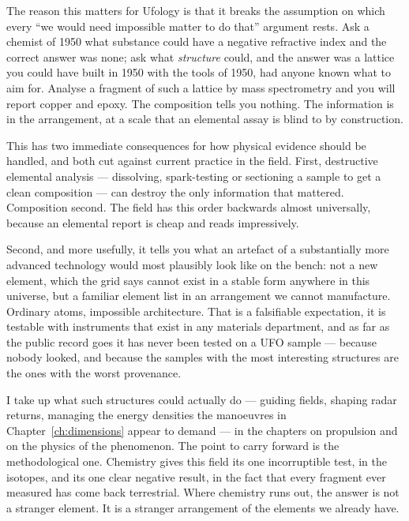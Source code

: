 The reason this matters for Ufology is that it breaks the assumption on which every ``we would
need impossible matter to do that'' argument rests.  Ask a chemist of 1950 what substance could have a negative
refractive index and the correct answer was none; ask what \emph{structure} could, and the answer
was a lattice you could have built in 1950 with the tools of 1950, had anyone known what to aim
for. Analyse a fragment of such a lattice by mass spectrometry and you will report copper and
epoxy. The composition tells you nothing. The information is in the arrangement, at a scale that
an elemental assay is blind to by construction.

This has two immediate consequences for how physical evidence should be handled, and both cut
against current practice in the field. First, destructive elemental analysis --- dissolving,
spark-testing or sectioning a sample to get a clean composition --- can destroy the only
information that mattered.  Composition second. The field has this order backwards almost universally, because
an elemental report is cheap and reads impressively.

Second, and more usefully, it tells you what an artefact of a substantially more advanced
technology would most plausibly look like on the bench: not a new element, which the grid says
cannot exist in a stable form anywhere in this universe, but a familiar element list in an
arrangement we cannot manufacture. Ordinary atoms, impossible architecture. That is a
falsifiable expectation, it is testable with instruments that exist in any materials department,
and as far as the public record goes it has never been tested on a UFO sample --- because nobody
looked, and because the samples with the most interesting structures are the ones with the worst
provenance.

I take up what such structures could actually do --- guiding fields, shaping radar returns,
managing the energy densities the manoeuvres in Chapter~\ref{ch:dimensions} appear to demand --- in
the chapters on propulsion and on the physics of the phenomenon. The point to carry forward is
the methodological one. Chemistry gives this field its one incorruptible test, in the isotopes,
and its one clear negative result, in the fact that every fragment ever measured has come back
terrestrial. Where chemistry runs out, the answer is not a stranger element. It is a stranger
arrangement of the elements we already have.


